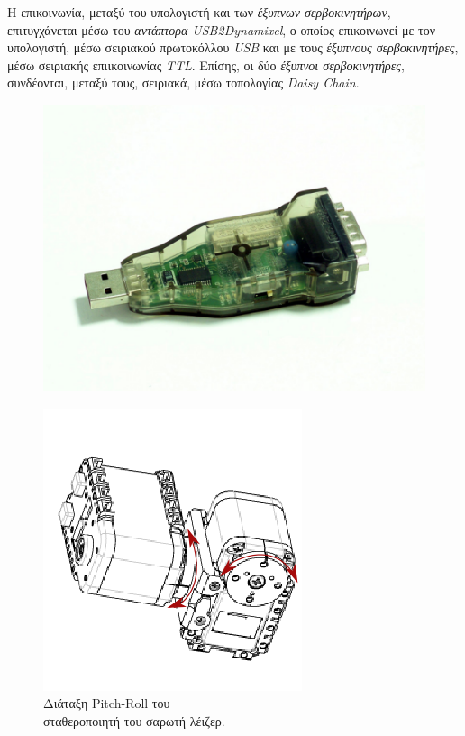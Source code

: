 \bigskip
Η επικοινωνία, μεταξύ του υπολογιστή και των \textit{έξυπνων σερβοκινητήρων}, επιτυγχάνεται μέσω του \textit{αντάπτορα USB2Dynamixel}, ο οποίος επικοινωνεί με τον υπολογιστή, μέσω σειριακού πρωτοκόλλου \textit{USB} και με τους \textit{έξυπνους σερβοκινητήρες}, μέσω σειριακής επιικοινωνίας \textit{TTL}. Επίσης, οι δύο \textit{έξυπνοι σερβοκινητήρες}, συνδέονται, μεταξύ τους, σειριακά, μέσω τοπολογίας \textit{Daisy Chain}.

\begin{figure}[!ht]
	\begin{minipage}[t]{.49\textwidth}
 	\centering
		\includegraphics[width=0.6\linewidth]{Chapters/Chapter2/Figures/usb2dynamixel.png}
		\label{fig:usb2dynamixel}
	\end{minipage}
	\begin{minipage}[t]{.5\textwidth}		
		\centering
		\includegraphics[width=0.5\linewidth]{Chapters/Chapter2/Figures/pitch_roll_dxl.png}
		\caption{Διάταξη Pitch-Roll του\\ σταθεροποιητή του σαρωτή λέιζερ.}
		\label{fig:pitch_roll_dxl}
	\end{minipage}
\end{figure}

